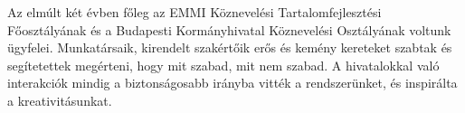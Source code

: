 Az elmúlt két évben főleg az EMMI Köznevelési Tartalomfejlesztési Főosztályának és a Budapesti Kormányhivatal Köznevelési Osztályának voltunk ügyfelei. Munkatársaik, kirendelt szakértőik erős és kemény kereteket szabtak és segítetettek megérteni, hogy mit szabad, mit nem szabad. A hivatalokkal való interakciók mindig a biztonságosabb irányba vitték a rendszerünket, és inspirálta a kreativitásunkat. 
 
